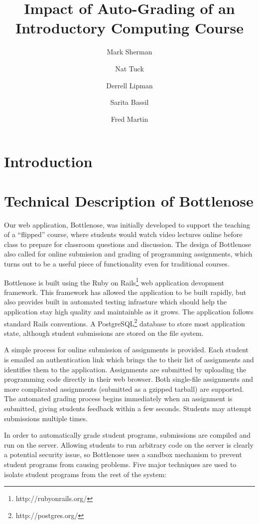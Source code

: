 \documentclass[11pt]{amsart}
\title{Impact of Auto-Grading of an Introductory Computing Course}
\author{Mark Sherman \and Nat Tuck \and Derrell Lipman \and Sarita Bassil \and Fred Martin}
\begin{document}
\maketitle

\section{Introduction}

\section{Technical Description of Bottlenose}

Our web application, Bottlenose, was initially developed to support
the teaching of a ``flipped'' course, where students would watch video
lectures online before class to prepare for classroom questions and
discussion. The design of Bottlenose also called for online submission
and grading of programming assignments, which turns out to be a useful
piece of functionality even for traditional courses.

Bottlenose is built using the Ruby on
Rails\footnote{http://rubyonrails.org/} web application devopment
framework. This framework has allowed the application to be built
rapidly, but also provides built in automated testing infrasture which
should help the application stay high quality and maintainble as it
grows. The application follows standard Rails conventions. A
PostgreSQL\footnote{http://postgres.org/} database to store most
application state, although student submissions are stored on the file
system.

A simple process for online submission of assignments is
provided. Each student is emailed an authentication link which brings
the to their list of assignments and identifies them to the
application. Assignments are submitted by uploading the programming
code directly in their web browser. Both single-file assignments and
more complicated assignments (submitted as a gzipped tarball) are
supported. The automated grading process begins immediately when an
assignment is submitted, giving students feedback within a few
seconds.  Students may attempt submissions multiple times.

In order to automatically grade student programs, submissions are
compiled and run on the server. Allowing students to run arbitrary
code on the server is clearly a potential security issue, so
Bottlenose uses a sandbox mechanism to prevent student programs from
causing problems. Five major techniques are used to isolate student
programs from the rest of the system:
\end{document}
